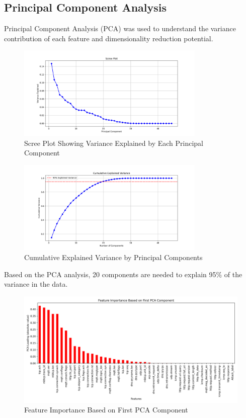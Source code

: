 \documentclass{article}
\begin{document}
\subsection{Principal Component Analysis}
Principal Component Analysis (PCA) was used to understand the variance contribution of each feature and dimensionality reduction potential.
\begin{figure}[ht]
\centering
\includegraphics[width=0.8\textwidth]{plots/pca_scree_plot.png}
\caption{Scree Plot Showing Variance Explained by Each Principal Component}
\label{fig:pca_scree}
\end{figure}
\begin{figure}[ht]
\centering
\includegraphics[width=0.8\textwidth]{plots/pca_cumulative_variance.png}
\caption{Cumulative Explained Variance by Principal Components}
\label{fig:pca_cumulative}
\end{figure}
Based on the PCA analysis, 20 components are needed to explain 95\% of the variance in the data.
\begin{figure}[ht]
\centering
\includegraphics[width=\textwidth]{plots/pca_feature_importance.png}
\caption{Feature Importance Based on First PCA Component}
\label{fig:pca_importance}
\end{figure}
\end{document}
